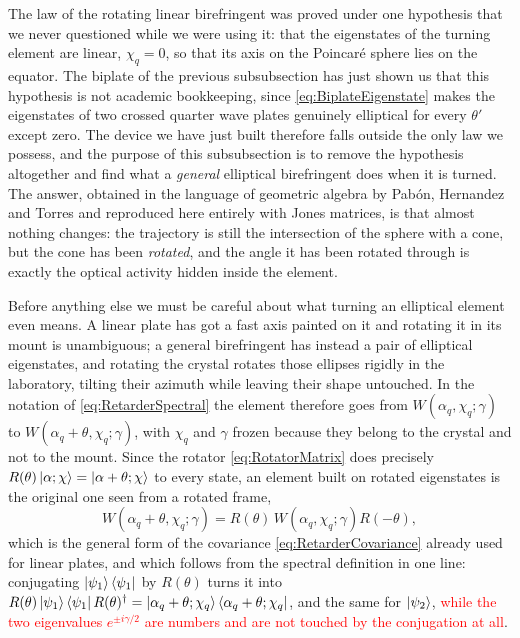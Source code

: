             The law of the rotating linear birefringent was proved under one hypothesis that we never questioned while we were using it: that the eigenstates of the turning element are linear, $\chi_q=0$, so that its axis on the Poincaré sphere lies on the equator. The biplate of the previous subsubsection has just shown us that this hypothesis is not academic bookkeeping, since \ref{eq:BiplateEigenstate} makes the eigenstates of two crossed quarter wave plates genuinely elliptical for every $\theta'$ except zero. The device we have just built therefore falls outside the only law we possess, and the purpose of this subsubsection is to remove the hypothesis altogether and find what a \textit{general} elliptical birefringent does when it is turned. The answer, obtained in the language of geometric algebra by Pabón, Hernandez and Torres \citep{pabon2023tunable} and reproduced here entirely with Jones matrices, is that almost nothing changes: the trajectory is still the intersection of the sphere with a cone, but the cone has been \textit{rotated}, and the angle it has been rotated through is exactly the optical activity hidden inside the element.

            Before anything else we must be careful about what turning an elliptical element even means. A linear plate has got a fast axis painted on it and rotating it in its mount is unambiguous; a general birefringent has instead a pair of elliptical eigenstates, and rotating the crystal rotates those ellipses rigidly in the laboratory, tilting their azimuth while leaving their shape untouched. In the notation of \ref{eq:RetarderSpectral} the element therefore goes from $W(\alpha_q,\chi_q;\gamma)$ to $W(\alpha_q+\theta,\chi_q;\gamma)$, with $\chi_q$ and $\gamma$ frozen because they belong to the crystal and not to the mount. Since the rotator \ref{eq:RotatorMatrix} does precisely $R(\theta)\ket{\alpha;\chi}=\ket{\alpha+\theta;\chi}$ to every state, an element built on rotated eigenstates is the original one seen from a rotated frame,
            \begin{equation}\label{eq:BodilyRotation}
                W\left(\alpha_q+\theta,\chi_q;\gamma\right) = R(\theta)\,W\left(\alpha_q,\chi_q;\gamma\right)R(-\theta),
            \end{equation}
            which is the general form of the covariance \ref{eq:RetarderCovariance} already used for linear plates, and which follows from the spectral definition in one line: conjugating $\ket{\psi_1}\bra{\psi_1}$ by $R(\theta)$ turns it into $R(\theta)\ket{\psi_1}\bra{\psi_1}R(\theta)^{\dagger}=\ket{\alpha_q+\theta;\chi_q}\bra{\alpha_q+\theta;\chi_q}$, and the same for $\ket{\psi_2}$, \textcolor{red}{while the two eigenvalues $e^{\pm i\gamma/2}$ are numbers and are not touched by the conjugation at all}.

